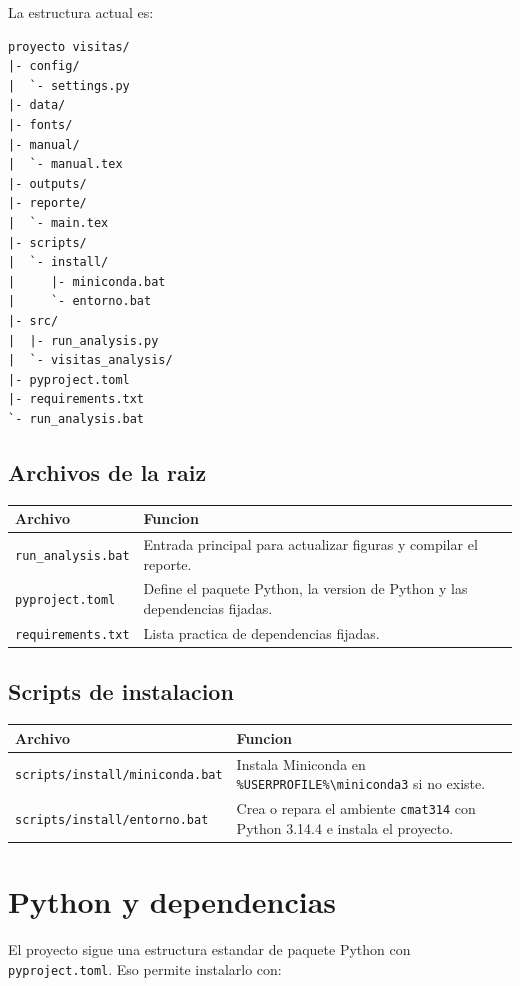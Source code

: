 \documentclass[11pt,letterpaper]{article}
\newcommand{\code}[1]{\texttt{#1}}
\begin{document}
La estructura actual es:

\begin{verbatim}
proyecto visitas/
|- config/
|  `- settings.py
|- data/
|- fonts/
|- manual/
|  `- manual.tex
|- outputs/
|- reporte/
|  `- main.tex
|- scripts/
|  `- install/
|     |- miniconda.bat
|     `- entorno.bat
|- src/
|  |- run_analysis.py
|  `- visitas_analysis/
|- pyproject.toml
|- requirements.txt
`- run_analysis.bat
\end{verbatim}

\subsection{Archivos de la raiz}

\begin{longtable}{p{} p{}}
\toprule
\textbf{Archivo} & \textbf{Funcion} \\
\midrule
\endhead
\code{run\_analysis.bat} & Entrada principal para actualizar figuras y compilar el reporte. \\
\code{pyproject.toml} & Define el paquete Python, la version de Python y las dependencias fijadas. \\
\code{requirements.txt} & Lista practica de dependencias fijadas. \\
\bottomrule
\end{longtable}

\subsection{Scripts de instalacion}

\begin{longtable}{p{} p{}}
\toprule
\textbf{Archivo} & \textbf{Funcion} \\
\midrule
\endhead
\code{scripts/install/miniconda.bat} & Instala Miniconda en \code{\%USERPROFILE\%\textbackslash miniconda3} si no existe. \\
\code{scripts/install/entorno.bat} & Crea o repara el ambiente \code{cmat314} con Python 3.14.4 e instala el proyecto. \\
\bottomrule
\end{longtable}

\section{Python y dependencias}

El proyecto sigue una estructura estandar de paquete Python con
\code{pyproject.toml}. Eso permite instalarlo con:
\end{document}
